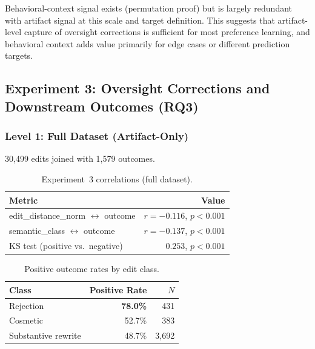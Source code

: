 \documentclass[11pt]{article}
\begin{document}
Behavioral-context signal exists (permutation proof) but is largely redundant with artifact signal at this scale and target definition.
This suggests that artifact-level capture of oversight corrections is sufficient for most preference learning, and behavioral context adds value primarily for edge cases or different prediction targets.

\subsection{Experiment 3: Oversight Corrections and Downstream Outcomes (RQ3)}
\label{sec:exp3}

\subsubsection{Level 1: Full Dataset (Artifact-Only)}

30{,}499 edits joined with 1{,}579 outcomes.

\begin{table}[h]
\centering
\caption{Experiment~3 correlations (full dataset).}
\label{tab:exp3-correlations}
\begin{tabular}{@{}lr@{}}
\toprule
\textbf{Metric} & \textbf{Value} \\
\midrule
edit\_distance\_norm $\leftrightarrow$ outcome & $r = -0.116$, $p < 0.001$ \\
semantic\_class $\leftrightarrow$ outcome      & $r = -0.137$, $p < 0.001$ \\
KS test (positive vs.\ negative)               & $0.253$, $p < 0.001$ \\
\bottomrule
\end{tabular}
\end{table}

\begin{table}[h]
\centering
\caption{Positive outcome rates by edit class.}
\label{tab:outcome-by-class}
\begin{tabular}{@{}lrr@{}}
\toprule
\textbf{Class} & \textbf{Positive Rate} & $N$ \\
\midrule
Rejection              & \textbf{78.0\%} & 431 \\
Cosmetic               & 52.7\%          & 383 \\
Substantive rewrite    & 48.7\%          & 3{,}692 \\
\bottomrule
\end{tabular}
\end{table}
\end{document}
